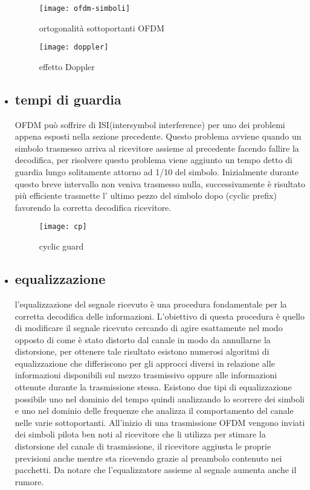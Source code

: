 \begin{itemize}
	 \begin{figure}[h]
	 	\centering
		\begin{minipage}[b]{.5\columnwidth}
	 		\texttt{[image: ofdm-simboli]}
	 		\caption{ortogonalità sottoportanti OFDM \cite{ofdm-simboli}}\label{fig:1}
 		\end{minipage}\hfill
 		\begin{minipage}[b]{.5\columnwidth}
 			\texttt{[image: doppler]}
 			\caption{effetto Doppler \cite{doppler}}\label{fig:1}
 		\end{minipage}\hfill
 	\end{figure}
 	 \item \subsection{tempi di guardia } OFDM può soffrire di ISI(intersymbol interference) per uno dei problemi appena esposti nella sezione precedente. Questo problema avviene quando un simbolo trasmesso arriva al ricevitore assieme al precedente facendo fallire la decodifica, per risolvere questo problema viene aggiunto un tempo detto di guardia lungo solitamente attorno ad 1/10 del simbolo. Inizialmente durante questo breve intervallo non veniva trasmesso nulla, successivamente è risultato più efficiente trasmette l' ultimo pezzo del simbolo dopo (cyclic prefix) favorendo la corretta decodifica  ricevitore.
 	 \begin{figure}[h]
 	 	\centering
 	 	\texttt{[image: cp]}
 	 	\caption{cyclic guard \cite{cp}}\label{fig:1}
 	 \end{figure}
     \item \subsection{equalizzazione} l'equalizzazione del segnale ricevuto è una procedura fondamentale per la corretta decodifica delle informazioni. L'obiettivo di questa procedura è quello di modificare il segnale ricevuto cercando di agire esattamente nel modo opposto di come è stato distorto dal canale in modo da annullarne la distorsione, per ottenere tale risultato esistono numerosi algoritmi di equalizzazione che differiscono per gli approcci diversi in relazione alle informazioni disponibili sul mezzo trasmissivo oppure alle informazioni ottenute durante la trasmissione stessa. Esistono due tipi di equalizzazione possibile uno nel dominio del tempo quindi analizzando lo scorrere dei simboli e uno nel dominio delle frequenze che analizza il comportamento del canale nelle varie sottoportanti. All'inizio di una trasmissione OFDM vengono inviati dei simboli pilota ben noti al ricevitore che li utilizza per stimare la distorsione del canale di trasmissione, il ricevitore aggiusta le proprie previsioni anche mentre sta ricevendo grazie al preambolo contenuto nei pacchetti. Da notare che l'equalizzatore assieme al segnale aumenta anche il rumore.

\end{itemize}
